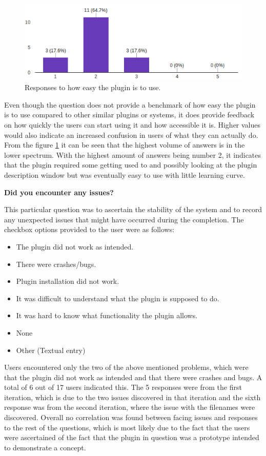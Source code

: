 \documentclass{4thYearProject}
\begin{document}
\begin{figure}[H]
\includegraphics[scale=0.6]{How_easy}
\centering
\caption{Responses to how easy the plugin is to use.}
\label{fig:howeasy}
\end{figure}

Even though the question does not provide a benchmark of how easy the plugin is to use compared to other similar plugins or systems, it does provide feedback on how quickly the users can start using it and how accessible it is. Higher values would also indicate an increased confusion in users of what they can actually do. 
From the figure \ref{fig:howeasy} it can be seen that the highest volume of answers is in the lower spectrum. With the highest amount of answers being number 2, it indicates that the plugin required some getting used to and possibly looking at the plugin description window but was eventually easy to use with little learning curve. 

\textbf{Did you encounter any issues?}

This particular question was to ascertain the stability of the system and to record any unexpected issues that might have occurred during the completion. The checkbox options provided to the user were as follows:
\begin{itemize}
\item The plugin did not work as intended.
\item There were crashes/bugs.
\item Plugin installation did not work.
\item It was difficult to understand what the plugin is supposed to do.
\item It was hard to know what functionality the plugin allows.
\item None
\item Other (Textual entry)
\end{itemize}

Users encountered only the two of the above mentioned problems, which were that the plugin did not work as intended and that there were crashes and bugs. A total of 6 out of 17 users indicated this. The 5 responses were from the first iteration, which is due to the two issues discovered in that iteration and the sixth response was from the second iteration, where the issue with the filenames were discovered. Overall no correlation was found between facing issues and responses to the rest of the questions, which is most likely due to the fact that the users were ascertained of the fact that the plugin in question was a prototype intended to demonstrate a concept. 
\end{document}
